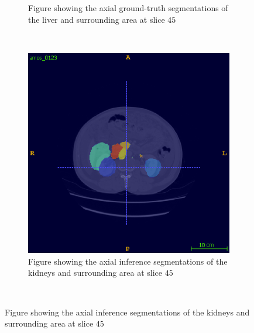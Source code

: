 \documentclass{l4proj}
\begin{document}
\begin{figure}[htb]
\begin{subfigure}[b]{0.45\textwidth}
        \caption{Figure showing the axial ground-truth segmentations of the liver and surrounding area at slice $45$}
        \label{fig:full_scan_example_results_kidney_gt}
    \end{subfigure}
    ~
    \begin{subfigure}[b]{0.45\textwidth}
        \includegraphics[width=\textwidth]{images/kidneys_inf.png}
        \caption{Figure showing the axial inference segmentations of the kidneys and surrounding area at slice $45$}
        \label{fig:full_scan_example_results_kidney_inf}
    \end{subfigure} \\


\end{figure}
\end{document}
